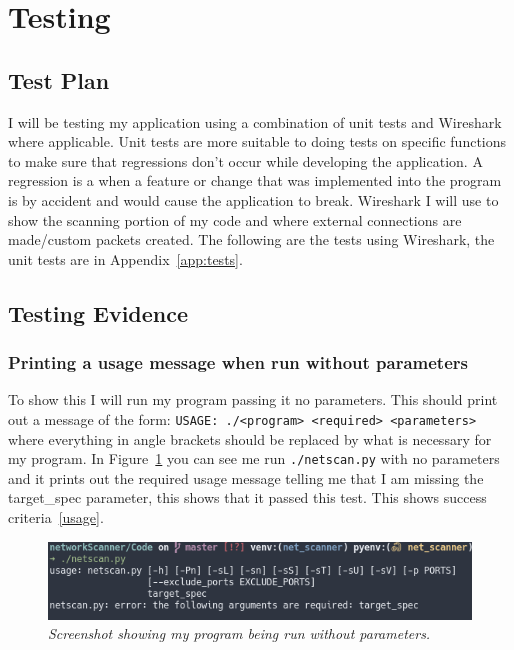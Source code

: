 \documentclass[titlepage]{article}
\let\Oldsection\section{}
\renewcommand{\section}{\FloatBarrier\Oldsection}
\let\Oldsubsection\subsection{}
\renewcommand{\subsection}{\FloatBarrier\Oldsubsection}
\let\Oldsubsubsection\subsubsection{}
\renewcommand{\subsubsection}{\FloatBarrier\Oldsubsubsection}
\begin{document}
\section{Testing}

\subsection{Test Plan}

I will be testing my application using a combination of unit tests and Wireshark where applicable.
Unit tests are more suitable to doing tests on specific functions to make sure that regressions don't occur while developing
the application. A regression is a when a feature or change that was implemented into the program is by accident and would 
cause the application to break. Wireshark I will use to show the scanning portion of my code and where external connections
are made/custom packets created. The following are the tests using Wireshark,
the unit tests are in Appendix~\ref{app:tests}.

\subsection{Testing Evidence}

\subsubsection{Printing a usage message when run without parameters}

To show this I will run my program passing it no parameters.
This should print out a message of the form: \verb|USAGE: ./<program> <required> <parameters>|
where everything in angle brackets should be replaced by what is necessary for my program. 
In Figure~\ref{noparametertest} you can see me run \verb|./netscan.py| with no parameters and it
prints out the required usage message telling me that I am missing the target\_spec parameter, this
shows that it passed this test.
This shows success criteria~\ref{usage}.
\begin{figure}[H]
  \centering
  \includegraphics[width=\textwidth]{noparameters.png}
  \caption{\textit{%
    Screenshot showing my program being run without parameters.
}}\label{noparametertest}
\end{figure}
\end{document}
